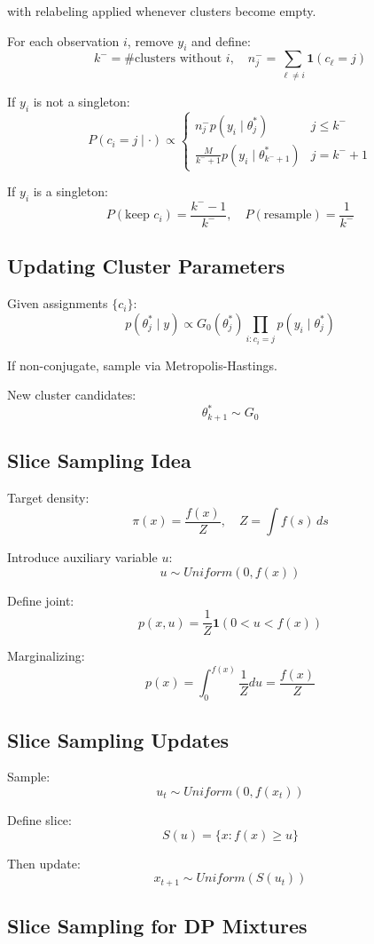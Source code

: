 \documentclass[12pt,oneside]{book}
\numberwithin{equation}{section}
\theoremstyle{definition}
\theoremstyle{plain}
\theoremstyle{remark}
\begin{document}
with relabeling applied whenever clusters become empty.

For each observation $i$, remove $y_i$ and define:
\[
k^- = \text{\# clusters without } i, \quad n_j^- = \sum_{\ell \neq i} \mathbf{1}(c_\ell = j)
\]

If $y_i$ is not a singleton:
\[
P(c_i = j \mid \cdot) \propto
\begin{cases}
n_j^- p(y_i \mid \theta_j^*) & j \le k^- \\
\frac{M}{k^- + 1} p(y_i \mid \theta_{k^-+1}^*) & j = k^- + 1
\end{cases}
\]

If $y_i$ is a singleton:
\[
P(\text{keep } c_i) = \frac{k^- - 1}{k^-}, \quad
P(\text{resample}) = \frac{1}{k^-}
\]

\subsection*{Updating Cluster Parameters}

Given assignments $\{c_i\}$:
\[
p(\theta_j^* \mid y) \propto G_0(\theta_j^*) \prod_{i:c_i=j} p(y_i \mid \theta_j^*)
\]

If non-conjugate, sample via Metropolis-Hastings.

New cluster candidates:
\[
\theta_{k+1}^* \sim G_0
\]

\subsection*{Slice Sampling Idea}

Target density:
\[
\pi(x) = \frac{f(x)}{Z}, \quad Z = \int f(s)\,ds
\]

Introduce auxiliary variable $u$:
\[
u \sim Uniform(0, f(x))
\]

Define joint:
\[
p(x,u) = \frac{1}{Z} \mathbf{1}(0 < u < f(x))
\]

Marginalizing:
\[
p(x) = \int_0^{f(x)} \frac{1}{Z} du = \frac{f(x)}{Z}
\]

\subsection*{Slice Sampling Updates}

Sample:
\[
u_t \sim Uniform(0, f(x_t))
\]

Define slice:
\[
S(u) = \{x : f(x) \ge u\}
\]

Then update:
\[
x_{t+1} \sim Uniform(S(u_t))
\]

\subsection*{Slice Sampling for DP Mixtures}
\end{document}
